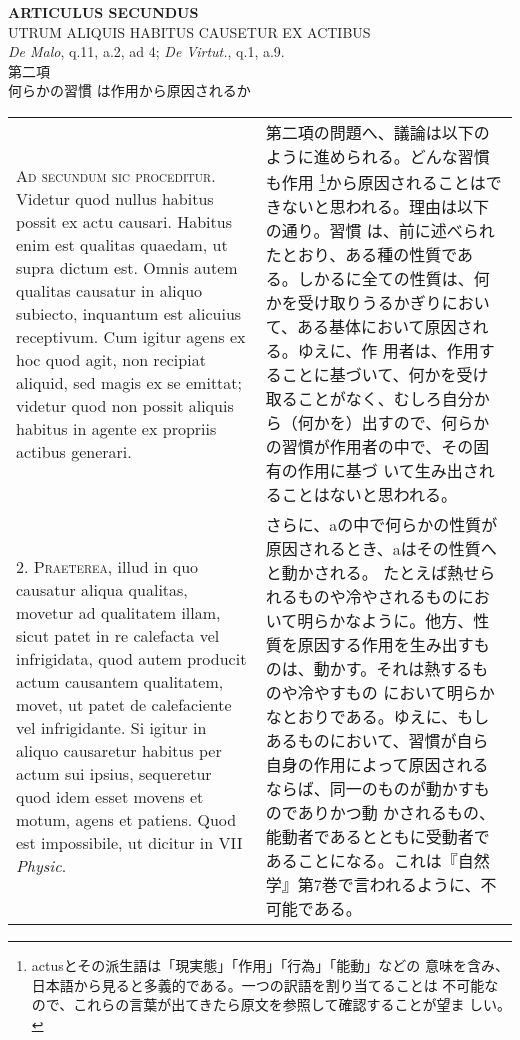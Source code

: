 \documentclass[10pt]{jsarticle} %
\begin{document}
\begin{center}
{\Large {\bf ARTICULUS SECUNDUS}}\\ {\large UTRUM ALIQUIS HABITUS
CAUSETUR EX ACTIBUS}\\ {\footnotesize {\itshape De Malo}, q.11, a.2,
ad 4; {\itshape De Virtut.}, q.1, a.9.}\\ {\Large 第二項\\何らかの習慣
は作用から原因されるか}
\end{center}

\begin{longtable}{p{21em}p{21em}}

{\scshape Ad secundum sic proceditur}. Videtur quod nullus habitus
possit ex actu causari. Habitus enim est qualitas quaedam, ut supra
dictum est. Omnis autem qualitas causatur in aliquo subiecto,
inquantum est alicuius receptivum. Cum igitur agens ex hoc quod agit,
non recipiat aliquid, sed magis ex se emittat; videtur quod non possit
aliquis habitus in agente ex propriis actibus generari.

&

第二項の問題へ、議論は以下のように進められる。どんな習慣も作用
\footnote{actusとその派生語は「現実態」「作用」「行為」「能動」などの
意味を含み、日本語から見ると多義的である。一つの訳語を割り当てることは
不可能なので、これらの言葉が出てきたら原文を参照して確認することが望ま
しい。}から原因されることはできないと思われる。理由は以下の通り。習慣
は、前に述べられたとおり、ある種の性質である。しかるに全ての性質は、何
かを受け取りうるかぎりにおいて、ある基体において原因される。ゆえに、作
用者は、作用することに基づいて、何かを受け取ることがなく、むしろ自分か
ら（何かを）出すので、何らかの習慣が作用者の中で、その固有の作用に基づ
いて生み出されることはないと思われる。


\\




2. {\scshape Praeterea}, illud in quo causatur aliqua qualitas,
movetur ad qualitatem illam, sicut patet in re calefacta vel
infrigidata, quod autem producit actum causantem qualitatem, movet, ut
patet de calefaciente vel infrigidante. Si igitur in aliquo causaretur
habitus per actum sui ipsius, sequeretur quod idem esset movens et
motum, agens et patiens. Quod est impossibile, ut dicitur in VII
{\itshape Physic}.

&

さらに、aの中で何らかの性質が原因されるとき、aはその性質へと動かされる。
たとえば熱せられるものや冷やされるものにおいて明らかなように。他方、性
質を原因する作用を生み出すものは、動かす。それは熱するものや冷やすもの
において明らかなとおりである。ゆえに、もしあるものにおいて、習慣が自ら
自身の作用によって原因されるならば、同一のものが動かすものでありかつ動
かされるもの、能動者であるとともに受動者であることになる。これは『自然
学』第7巻で言われるように、不可能である。



\end{longtable}
\end{document}

